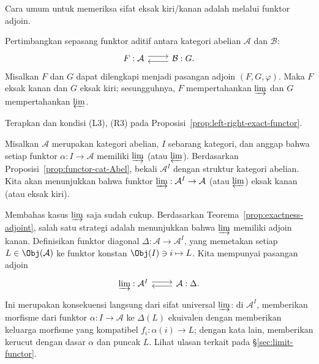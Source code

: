 Cara umum untuk memeriksa sifat eksak kiri/kanan adalah melalui funktor adjoin.

\begin{teorema}\label{prop:exactness-adjoint}
Pertimbangkan sepasang funktor aditif antara kategori abelian $\mathcal{A}$ dan
$\mathcal{B}$:
\[\begin{tikzcd}
	F: \mathcal{A} \arrow[r, yshift=0.3em] & \mathcal{B} :G \arrow[l, yshift=-0.3em] .
\end{tikzcd}\]
Misalkan $F$ dan $G$ dapat dilengkapi menjadi pasangan adjoin $(F,G,\varphi)$.
Maka $F$ eksak kanan dan $G$ eksak kiri; sesungguhnya, $F$ mempertahankan
$\varinjlim$ dan $G$ mempertahankan $\varprojlim$.
\end{teorema}

\begin{bukti}
Terapkan \cite[Teorema 2.8.12]{Li1} dan kondisi (L3), (R3) pada
Proposisi~\ref{prop:left-right-exact-functor}.
\end{bukti}

\begin{contoh}\label{eg:limit-exactness}
Misalkan $\mathcal{A}$ merupakan kategori abelian, $I$ sebarang kategori, dan
anggap bahwa setiap funktor $\alpha:I\to\mathcal{A}$ memiliki $\varinjlim$ (atau
$\varprojlim$). Berdasarkan Proposisi~\ref{prop:functor-cat-Abel}, bekali
$\mathcal{A}^I$ dengan struktur kategori abelian. Kita akan menunjukkan bahwa
funktor $\varinjlim:\mathcal{A}^I\to\mathcal{A}$ (atau $\varprojlim$) eksak kanan
(atau eksak kiri).

Membahas kasus $\varinjlim$ saja sudah cukup. Berdasarkan Teorema~\ref{prop:exactness-adjoint},
salah satu strategi adalah menunjukkan bahwa $\varinjlim$ memiliki adjoin kanan.
Definisikan funktor diagonal $\Delta:\mathcal{A}\to\mathcal{A}^I$, yang memetakan
setiap $L\in\Obj(\mathcal{A})$ ke funktor konstan $\Obj(I)\ni i\mapsto L$. Kita
mempunyai pasangan adjoin
\[\begin{tikzcd}
	\varinjlim : \mathcal{A}^I \arrow[shift left, r] & \mathcal{A}: \Delta \arrow[l, shift left] .
\end{tikzcd}\]
Ini merupakan konsekuensi langsung dari sifat universal $\varinjlim$: di
$\mathcal{A}^I$, memberikan morfisme dari funktor $\alpha:I\to\mathcal{A}$ ke
$\Delta(L)$ ekuivalen dengan memberikan keluarga morfisme yang kompatibel
$f_i:\alpha(i)\to L$; dengan kata lain, memberikan kerucut dengan dasar $\alpha$
dan puncak $L$. Lihat ulasan terkait pada \S\ref{sec:limit-functor}.
\end{contoh}

